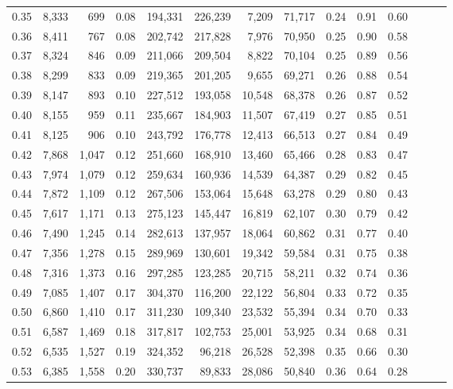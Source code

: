 \begin{tabular}{rrrrrrrrrrrrrr}
0.35 &  8,333 &    699 &  0.08 &  194,331 &  226,239 &   7,209 &  71,717 &  0.24 &  0.91 &      0.60 \\
0.36 &  8,411 &    767 &  0.08 &  202,742 &  217,828 &   7,976 &  70,950 &  0.25 &  0.90 &      0.58 \\
0.37 &  8,324 &    846 &  0.09 &  211,066 &  209,504 &   8,822 &  70,104 &  0.25 &  0.89 &      0.56 \\
0.38 &  8,299 &    833 &  0.09 &  219,365 &  201,205 &   9,655 &  69,271 &  0.26 &  0.88 &      0.54 \\
0.39 &  8,147 &    893 &  0.10 &  227,512 &  193,058 &  10,548 &  68,378 &  0.26 &  0.87 &      0.52 \\
0.40 &  8,155 &    959 &  0.11 &  235,667 &  184,903 &  11,507 &  67,419 &  0.27 &  0.85 &      0.51 \\
0.41 &  8,125 &    906 &  0.10 &  243,792 &  176,778 &  12,413 &  66,513 &  0.27 &  0.84 &      0.49 \\
0.42 &  7,868 &  1,047 &  0.12 &  251,660 &  168,910 &  13,460 &  65,466 &  0.28 &  0.83 &      0.47 \\
0.43 &  7,974 &  1,079 &  0.12 &  259,634 &  160,936 &  14,539 &  64,387 &  0.29 &  0.82 &      0.45 \\
0.44 &  7,872 &  1,109 &  0.12 &  267,506 &  153,064 &  15,648 &  63,278 &  0.29 &  0.80 &      0.43 \\
0.45 &  7,617 &  1,171 &  0.13 &  275,123 &  145,447 &  16,819 &  62,107 &  0.30 &  0.79 &      0.42 \\
0.46 &  7,490 &  1,245 &  0.14 &  282,613 &  137,957 &  18,064 &  60,862 &  0.31 &  0.77 &      0.40 \\
0.47 &  7,356 &  1,278 &  0.15 &  289,969 &  130,601 &  19,342 &  59,584 &  0.31 &  0.75 &      0.38 \\
0.48 &  7,316 &  1,373 &  0.16 &  297,285 &  123,285 &  20,715 &  58,211 &  0.32 &  0.74 &      0.36 \\
0.49 &  7,085 &  1,407 &  0.17 &  304,370 &  116,200 &  22,122 &  56,804 &  0.33 &  0.72 &      0.35 \\
0.50 &  6,860 &  1,410 &  0.17 &  311,230 &  109,340 &  23,532 &  55,394 &  0.34 &  0.70 &      0.33 \\
0.51 &  6,587 &  1,469 &  0.18 &  317,817 &  102,753 &  25,001 &  53,925 &  0.34 &  0.68 &      0.31 \\
0.52 &  6,535 &  1,527 &  0.19 &  324,352 &   96,218 &  26,528 &  52,398 &  0.35 &  0.66 &      0.30 \\
0.53 &  6,385 &  1,558 &  0.20 &  330,737 &   89,833 &  28,086 &  50,840 &  0.36 &  0.64 &      0.28 \\

\end{tabular}
